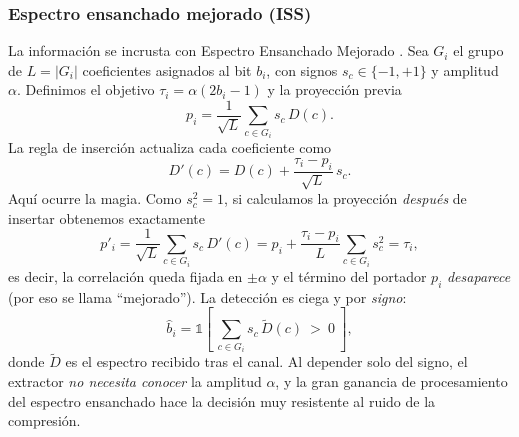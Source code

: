 \documentclass[12pt,a4paper]{article}
\begin{document}
\subsubsection*{Espectro ensanchado mejorado (ISS)}
La información se incrusta con Espectro Ensanchado Mejorado \cite{malvar2003}. Sea $G_i$ el
grupo de $L=|G_i|$ coeficientes asignados al bit $b_i$, con signos $s_c\in\{-1,+1\}$ y
amplitud $\alpha$. Definimos el objetivo $\tau_i=\alpha(2b_i-1)$ y la proyección previa
\begin{equation}
p_i = \frac{1}{\sqrt{L}}\sum_{c\in G_i} s_c\,D(c).
\end{equation}
La regla de inserción actualiza cada coeficiente como
\begin{equation}
D'(c) = D(c) + \frac{\tau_i - p_i}{\sqrt{L}}\,s_c .
\end{equation}
Aquí ocurre la magia. Como $s_c^2=1$, si calculamos la proyección \emph{después} de
insertar obtenemos exactamente
\begin{equation}
p'_i = \frac{1}{\sqrt L}\sum_{c\in G_i} s_c\,D'(c)
     = p_i + \frac{\tau_i-p_i}{L}\sum_{c\in G_i} s_c^2 = \tau_i,
\end{equation}
es decir, la correlación queda fijada en $\pm\alpha$ y el término del portador $p_i$
\emph{desaparece} (por eso se llama ``mejorado''). La detección es ciega y por \emph{signo}:
\begin{equation}
\hat{b}_i = \mathbb{1}\!\left[\ \sum_{c\in G_i} s_c\,\tilde D(c) \ > \ 0\ \right],
\end{equation}
donde $\tilde D$ es el espectro recibido tras el canal. Al depender solo del signo, el
extractor \emph{no necesita conocer} la amplitud $\alpha$, y la gran ganancia de
procesamiento del espectro ensanchado hace la decisión muy resistente al ruido de la
compresión.
\end{document}
